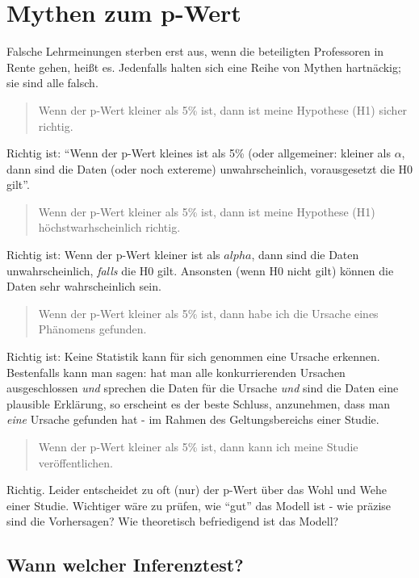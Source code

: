 \documentclass[12pt,ngerman,]{book}
\theoremstyle{definition}
\theoremstyle{definition}
\theoremstyle{remark}
\begin{document}
\section{Mythen zum p-Wert}\label{mythen-zum-p-wert}

Falsche Lehrmeinungen sterben erst aus, wenn die beteiligten Professoren
in Rente gehen, heißt es. Jedenfalls halten sich eine Reihe von Mythen
hartnäckig; sie sind alle falsch.

\begin{quote}
Wenn der p-Wert kleiner als 5\% ist, dann ist meine Hypothese (H1)
sicher richtig.
\end{quote}

Richtig ist: ``Wenn der p-Wert kleines ist als 5\% (oder allgemeiner:
kleiner als \(\alpha\), dann sind die Daten (oder noch extereme)
unwahrscheinlich, vorausgesetzt die H0 gilt''.

\begin{quote}
Wenn der p-Wert kleiner als 5\% ist, dann ist meine Hypothese (H1)
höchstwarhscheinlich richtig.
\end{quote}

Richtig ist: Wenn der p-Wert kleiner ist als \(alpha\), dann sind die
Daten unwahrscheinlich, \emph{falls} die H0 gilt. Ansonsten (wenn H0
nicht gilt) können die Daten sehr wahrscheinlich sein.

\begin{quote}
Wenn der p-Wert kleiner als 5\% ist, dann habe ich die Ursache eines
Phänomens gefunden.
\end{quote}

Richtig ist: Keine Statistik kann für sich genommen eine Ursache
erkennen. Bestenfalls kann man sagen: hat man alle konkurrierenden
Ursachen ausgeschlossen \emph{und} sprechen die Daten für die Ursache
\emph{und} sind die Daten eine plausible Erklärung, so erscheint es der
beste Schluss, anzunehmen, dass man \emph{eine} Ursache gefunden hat -
im Rahmen des Geltungsbereichs einer Studie.

\begin{quote}
Wenn der p-Wert kleiner als 5\% ist, dann kann ich meine Studie
veröffentlichen.
\end{quote}

Richtig. Leider entscheidet zu oft (nur) der p-Wert über das Wohl und
Wehe einer Studie. Wichtiger wäre zu prüfen, wie ``gut'' das Modell ist
- wie präzise sind die Vorhersagen? Wie theoretisch befriedigend ist das
Modell?

\subsection{Wann welcher Inferenztest?}\label{wann-welcher-inferenztest}
\end{document}

